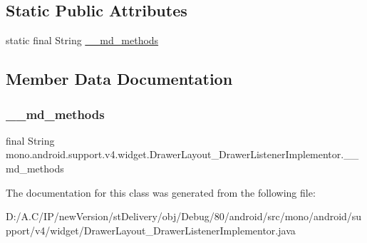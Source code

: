 \subsection*{Static Public Attributes}
\begin{DoxyCompactItemize}
\item 
static final String \hyperlink{classmono_1_1android_1_1support_1_1v4_1_1widget_1_1_drawer_layout___drawer_listener_implementor_a7a043c89da462068f6a987eb0eaaf8f3}{\+\_\+\+\_\+md\+\_\+methods}
\end{DoxyCompactItemize}


\subsection{Member Data Documentation}
\mbox{\label{classmono_1_1android_1_1support_1_1v4_1_1widget_1_1_drawer_layout___drawer_listener_implementor_a7a043c89da462068f6a987eb0eaaf8f3}} 
\subsubsection{\texorpdfstring{\+\_\+\+\_\+md\+\_\+methods}{\_\_md\_methods}}
{\footnotesize\ttfamily final String mono.\+android.\+support.\+v4.\+widget.\+Drawer\+Layout\+\_\+\+Drawer\+Listener\+Implementor.\+\_\+\+\_\+md\+\_\+methods\hspace{0.3cm}{\ttfamily [static]}}



The documentation for this class was generated from the following file\+:\begin{DoxyCompactItemize}
\item 
D\+:/\+A.\+C/\+I\+P/new\+Version/st\+Delivery/obj/\+Debug/80/android/src/mono/android/support/v4/widget/Drawer\+Layout\+\_\+\+Drawer\+Listener\+Implementor.\+java\end{DoxyCompactItemize}
